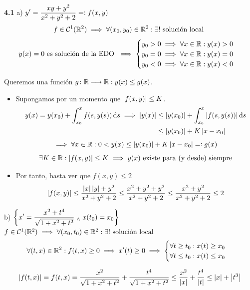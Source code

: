 \textbf{4.1} a) $\displaystyle y' = \frac{xy + y^2}{x^2 + y^2 + 2} =\vcentcolon f(x, y)$
\[f\in \mathcal{C}^1(\mathbb{R}^2) \implies \forall (x_0, y_0) \in \mathbb{R}^2 : \exists ! \text{ solución local }\]
\[y(x)=0 \text{ es solución de la EDO }\implies \begin{cases}
		y_0>0 \implies \forall x \in \mathbb{R} : y(x)>0 \\
		y_0=0 \implies \forall x \in \mathbb{R} : y(x)=0 \\
		y_0<0 \implies \forall x \in \mathbb{R} : y(x)<0 \\
	\end{cases}\]

Queremos una función $g \colon \mathbb{R} \longrightarrow \mathbb{R} : y(x) \leq g(x)$.
\begin{itemize}
	\item Supongamos por un momento que $\left|f(x, y)\right|\leq K$.
	      \[\ds \begin{aligned}
			      y(x)=y(x_0) + \int_{x_0}^x f(s, y(s)) \odif{s}\implies
			      \abs{y(x)} & \leq \abs{y(x_0)} + \int_{x_0}^x \abs{f(s,y(s))} \odif{s} \\
			                 & \leq \abs{y(x_0)} + K\abs{x-x_0}
		      \end{aligned}\]
	      \[\implies \forall x \in \mathbb{R} : 0 < y(x) \leq \left|y(x_0)\right| + K\left|x-x_0\right| =\vcentcolon g(x)\]
	      \[\exists K \in \mathbb{R} : \left|f(x, y)\right| \leq K \implies y(x) \text{ existe para (y desde) siempre}\]

	\item Por tanto, basta ver que $f(x, y) \leq 2$
	      \[\left|f(x, y)\right| \leq \frac{\left|x\right| \left|y\right| + y^2}{x^2+y^2 +2}\leq \frac{x^2+y^2 + y^2}{x^2+y^2 +2} \leq \frac{x^2 + y^2}{x^2+y^2+2}\leq 2\]
\end{itemize}

b) $\displaystyle \left\{x'=\frac{x^2+t^4}{\sqrt{1+x^2+t^2}} \; _{\wedge} \; x(t_0) = x_0\right\}$ $f\in \mathcal{C}^1(\mathbb{R}^2) \implies \forall (x_0, t_0) \in \mathbb{R}^2 : \exists ! \text{ solución local}$
\[\forall (t, x) \in \mathbb{R}^2 : f(t, x) \geq 0 \implies x'(t) \geq 0 \implies \begin{cases}
		\forall t \geq t_0 : x(t) \geq x_0 \\
		\forall t \leq t_0 : x(t) \leq x_0
	\end{cases}\]

\[\left|f(t, x)\right| = f(t, x) = \frac{x^2}{\sqrt{1+x^2+t^2}} + \frac{t^4}{\sqrt{1+x^2+t^2}} \leq \frac{x^2}{\left|x\right|} + \frac{t^4}{\left|t\right|} \leq \left|x\right| + \left|t^3\right|\]

